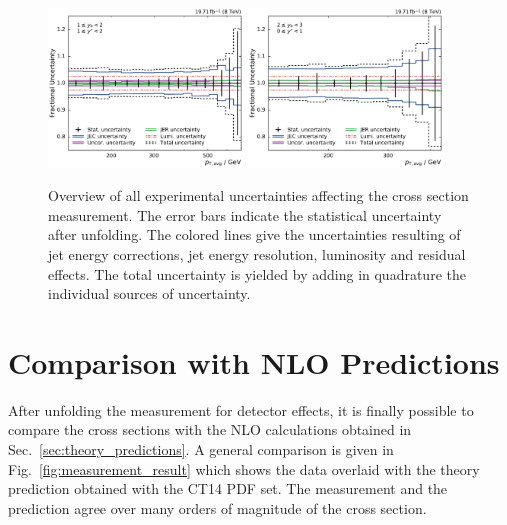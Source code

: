 \begin{figure}[htbp]
    \includegraphics[width=0.46\textwidth]{figures/measurement/exp_unc_overview_yb1ys1.pdf}\hfill
    \includegraphics[width=0.46\textwidth]{figures/measurement/exp_unc_overview_yb2ys0.pdf}
    \caption[Overview of experimental uncertainties]{Overview of all
    experimental uncertainties affecting the cross section measurement. The
    error bars indicate the statistical uncertainty after unfolding. The colored
    lines give the uncertainties resulting of jet energy corrections, jet energy
    resolution, luminosity and residual effects. The total uncertainty is yielded by
    adding in quadrature the individual sources of uncertainty.}
    \label{fig:exp_unc_overview}
\end{figure}

\section{Comparison with NLO Predictions}
\label{sec:nlo_comparisons}

After unfolding the measurement for detector effects, it is finally possible to
compare the cross sections with the NLO calculations obtained in
Sec.~\ref{sec:theory_predictions}. A general comparison is given in
Fig.~\ref{fig:measurement_result} which shows the data overlaid with the
\NLOJETPP theory prediction obtained with the CT14 PDF set. The measurement and the
prediction agree over many orders of magnitude of the cross section.


